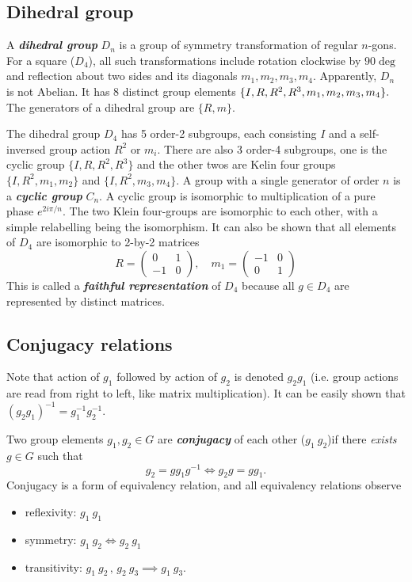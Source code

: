 \documentclass{article}
\begin{document}
\subsection{Dihedral group}
A \textit{\textbf{dihedral group}} $D_n$ is a group of symmetry transformation of regular $n$-gons. For a square ($D_4$), all such transformations include rotation clockwise by $90\deg$ and reflection about two sides and its diagonals $m_1, m_2, m_3, m_4.$ Apparently, $D_n$ is not Abelian. It has $8$ distinct group elements $\{I,R,R^{2}, R^3,  m_1, m_2, \newline m_3, m_4\}.$ The generators of a dihedral group are $\{R, m\}.$ 

The dihedral group $D_4$ has 5 order-2 subgroups, each consisting $I$ and a self-inversed group action $R^2$ or $m_i.$ There are also 3 order-4 subgroups, one is the cyclic group $\{I, R, R^2, R^3\}$ and the other twos are Kelin four groups $\{I, R^2, m_1, m_2\}$ and $\{I, R^2, m_3, m_4\}.$
A group with a single generator of order $n$ is a \textit{\textbf{cyclic group}} $C_n.$ A cyclic group is isomorphic to multiplication of a pure phase $e^{2 i \pi / n}. $ 
The two Klein four-groups are isomorphic to each other, with a simple relabelling being the isomorphism. It can also be shown that all elements of $D_4$ are isomorphic to 2-by-2 matrices 
\[
    R = \begin{pmatrix}
        0 & 1 \\
        -1 & 0
    \end{pmatrix}, \quad 
    m_1 = \begin{pmatrix}
        -1 & 0 \\
        0 & 1
    \end{pmatrix}
\]
This is called a \textit{\textbf{faithful representation}} of $D_4$ because all $g \in D_4$ are represented by distinct matrices.  

\subsection{Conjugacy relations}
Note that action of $g_1$ followed by action of $g_2$ is denoted $g_2 g_1$ (i.e. group actions are read from right to left, like matrix multiplication). It can be easily shown that $(g_2 g_1 )^{-1} = g_1^{-1} g_2^{-1}.$ 

Two group elements $g_1, g_2 \in G$ are \textit{\textbf{conjugacy}} of each other ($g_1 ~ g_2$)if there \textit{exists} $g \in G$ such that 
\[
    g_2 = g g_1 g^{-1} \Leftrightarrow g_2 g = g g_1.
\]
Conjugacy is a form of equivalency relation, and all equivalency relations observe
\begin{itemize}
    \item reflexivity: $g_1 ~ g_1$ 
    \item symmetry: $g_1 ~ g_2 \Leftrightarrow  g_2 ~ g_1$
    \item transitivity: $g_1 ~ g_2 \,, \, g_2 ~ g_3 \implies g_1 ~ g_3.$ 
\end{itemize}
\end{document}
